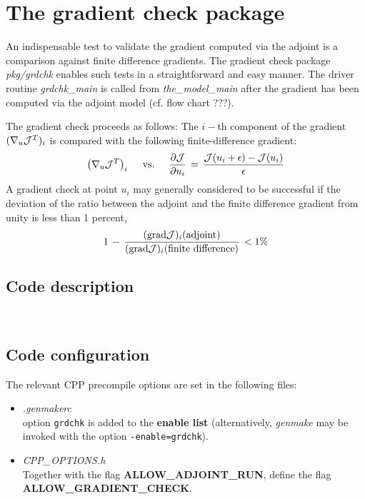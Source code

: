 
\section{The gradient check package}
\label{sect:ad_gradient_check}
\label{sec_ad_radient_check}

An indispensable test to validate the gradient computed
via the adjoint is a comparison against finite difference
gradients.
The gradient check package {\it pkg/grdchk} enables such tests
in a straightforward and easy manner.
The driver routine {\it grdchk\_main} is called from
{\it the\_model\_main} after the gradient has been computed
via the adjoint model (cf. flow chart ???).

The gradient check proceeds as follows:
The $i-$th component of the gradient $ (\nabla _{u}{\cal J}^T)_i $
is compared with  the following finite-difference gradient:
\[
\left(\nabla _{u}{\cal J}^T  \right)_i \quad \text{ vs. } \quad
\frac{\partial {\cal J}}{\partial u_i} \, = \,
\frac{ {\cal J}(u_i + \epsilon) - {\cal J}(u_i)}{\epsilon}
\]
A gradient check at point $u_i$ may generally considered to be successful
if the deviation of the ratio between the adjoint and the 
finite difference gradient from unity is less than 1 percent,
\[
1 \, - \, 
\frac{({\rm grad}{\cal J})_i (\text{adjoint})}
{({\rm grad}{\cal J})_i (\text{finite difference})} \, < 1 \%
\]

\subsection{Code description}
~

\subsection{Code configuration}
%
The relevant CPP precompile options are set
in the following files:
%
\begin{itemize}
%
\item {\it .genmakerc} \\
option {\tt grdchk} is added to the {\bf enable list}
(alternatively, {\it genmake} may be invoked with the
option {\tt -enable=grdchk}).
%
\item {\it CPP\_OPTIONS.h} \\
Together with the flag 
{\bf ALLOW\_ADJOINT\_RUN}, define the flag
{\bf ALLOW\_GRADIENT\_CHECK}.
%
\end{itemize}

